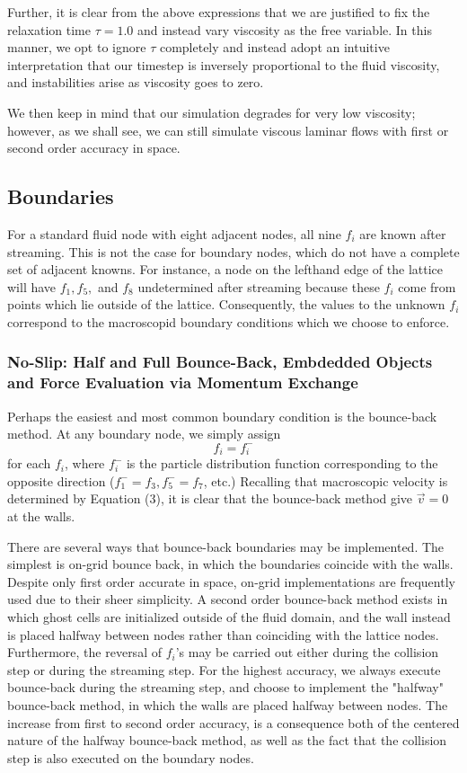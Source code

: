 \documentclass[a4paper]{article}
\begin{document}
Further, it is clear from the above expressions that we are justified to fix the relaxation time $\tau = 1.0$ and instead vary viscosity as the free variable. In this manner, we opt to ignore $\tau$ completely and instead adopt an intuitive interpretation that our timestep is inversely proportional to the fluid viscosity, and instabilities arise as viscosity goes to zero.

We then keep in mind that our simulation degrades for very low viscosity; however, as we shall see, we can still simulate viscous laminar flows with first or second order accuracy in space.

\subsection{Boundaries}
For a standard fluid node with eight adjacent nodes, all nine $f_i$ are known after streaming. This is not the case for boundary nodes, which do not have a complete set of adjacent knowns. For instance, a node on the lefthand edge of the lattice will have $f_1, f_5,$ and $f_8$ undetermined after streaming because these $f_i$ come from points which lie outside of the lattice. Consequently, the values to the unknown $f_i$ correspond to the macroscopid boundary conditions which we choose to enforce.

\subsubsection{No-Slip: Half and Full Bounce-Back, Embdedded Objects and Force Evaluation via Momentum Exchange}
Perhaps the easiest and most common boundary condition is the bounce-back method. At any boundary node, we simply assign \begin{equation}
    f_i = f_i^-
\end{equation}
for each $f_i$, where $f_i^-$ is the particle distribution function corresponding to the opposite direction ($f_1^- = f_3, f_5^- = f_7$, etc.) Recalling that macroscopic velocity is determined by Equation (3), it is clear that the bounce-back method give $\vec{v} = 0$ at the walls. 

There are several ways that bounce-back boundaries may be implemented. The simplest is on-grid bounce back, in which the boundaries coincide with the walls. Despite only first order accurate in space, on-grid implementations are frequently used due to their sheer simplicity. A second order bounce-back method exists in which ghost cells are initialized outside of the fluid domain, and the wall instead is placed halfway between nodes rather than coinciding with the lattice nodes. Furthermore, the reversal of $f_i$'s may be carried out either during the collision step or during the streaming step. For the highest accuracy, we always execute bounce-back during the streaming step, and choose to implement the "halfway" bounce-back method, in which the walls are placed halfway between nodes. The increase from first to second order accuracy, is a consequence both of the centered nature of the halfway bounce-back method, as well as the fact that the collision step is also executed on the boundary nodes.
\end{document}
